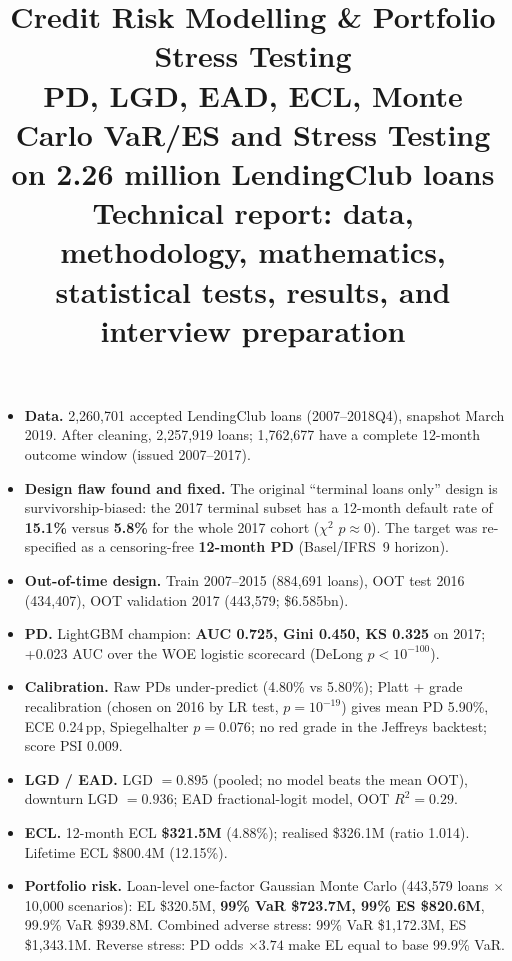 \documentclass[11pt,a4paper]{article}
\title{\textbf{Credit Risk Modelling \& Portfolio Stress Testing}\\[4pt]
\large PD, LGD, EAD, ECL, Monte Carlo VaR/ES and Stress Testing on 2.26 million LendingClub loans\\[2pt]
\normalsize Technical report: data, methodology, mathematics, statistical tests, results, and interview preparation}
\author{}
\date{}
\newcommand{\1}{\mathbf{1}}
\begin{document}
\sloppy
\maketitle
\thispagestyle{empty}

\begin{keybox}
\begin{itemize}[leftmargin=*,itemsep=1pt]
\item \textbf{Data.} 2{,}260{,}701 accepted LendingClub loans (2007--2018Q4), snapshot March 2019. After cleaning, 2{,}257{,}919 loans; 1{,}762{,}677 have a complete 12-month outcome window (issued 2007--2017).
\item \textbf{Design flaw found and fixed.} The original ``terminal loans only'' design is survivorship-biased: the 2017 terminal subset has a 12-month default rate of \textbf{15.1\%} versus \textbf{5.8\%} for the whole 2017 cohort ($\chi^2$ $p\approx0$). The target was re-specified as a censoring-free \textbf{12-month PD} (Basel/IFRS~9 horizon).
\item \textbf{Out-of-time design.} Train 2007--2015 (884{,}691 loans), OOT test 2016 (434{,}407), OOT validation 2017 (443{,}579; \$6.585bn).
\item \textbf{PD.} LightGBM champion: \textbf{AUC 0.725, Gini 0.450, KS 0.325} on 2017; +0.023 AUC over the WOE logistic scorecard (DeLong $p<10^{-100}$).
\item \textbf{Calibration.} Raw PDs under-predict (4.80\% vs 5.80\%); Platt + grade recalibration (chosen on 2016 by LR test, $p=10^{-19}$) gives mean PD 5.90\%, ECE 0.24\,pp, Spiegelhalter $p=0.076$; no red grade in the Jeffreys backtest; score PSI 0.009.
\item \textbf{LGD / EAD.} LGD $=0.895$ (pooled; no model beats the mean OOT), downturn LGD $=0.936$; EAD fractional-logit model, OOT $R^2=0.29$.
\item \textbf{ECL.} 12-month ECL \textbf{\$321.5M} (4.88\%); realised \$326.1M (ratio 1.014). Lifetime ECL \$800.4M (12.15\%).
\item \textbf{Portfolio risk.} Loan-level one-factor Gaussian Monte Carlo (443{,}579 loans $\times$ 10{,}000 scenarios): EL \$320.5M, \textbf{99\% VaR \$723.7M, 99\% ES \$820.6M}, 99.9\% VaR \$939.8M. Combined adverse stress: 99\% VaR \$1{,}172.3M, ES \$1{,}343.1M. Reverse stress: PD odds $\times3.74$ make EL equal to base 99.9\% VaR.
\end{itemize}
\end{keybox}

\tableofcontents
\newpage
\end{document}
